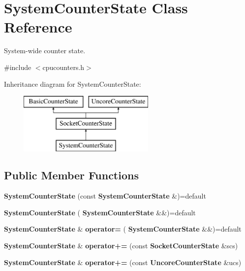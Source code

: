 \section{System\+Counter\+State Class Reference}
\label{classSystemCounterState}


System-\/wide counter state.  




{\ttfamily \#include $<$cpucounters.\+h$>$}

Inheritance diagram for System\+Counter\+State\+:\begin{figure}[H]
\begin{center}
\leavevmode
\includegraphics[height=3.000000cm]{classSystemCounterState}
\end{center}
\end{figure}
\subsection*{Public Member Functions}
\begin{DoxyCompactItemize}
\item 
\mbox{\label{classSystemCounterState_a45a2b6d817ea8ab53b280afe29632e58}} 
{\bfseries System\+Counter\+State} (const \textbf{ System\+Counter\+State} \&)=default
\item 
\mbox{\label{classSystemCounterState_a5c218867f23ed82ffda58a22314a1260}} 
{\bfseries System\+Counter\+State} (\textbf{ System\+Counter\+State} \&\&)=default
\item 
\mbox{\label{classSystemCounterState_a2016fdfda8e97189fcc96ca13cf4665e}} 
\textbf{ System\+Counter\+State} \& {\bfseries operator=} (\textbf{ System\+Counter\+State} \&\&)=default
\item 
\mbox{\label{classSystemCounterState_ae9f3b31d4a39371dc8acfa6e6c9b8fc0}} 
\textbf{ System\+Counter\+State} \& {\bfseries operator+=} (const \textbf{ Socket\+Counter\+State} \&scs)
\item 
\mbox{\label{classSystemCounterState_a91deae0a98f590d755da2d96c06be375}} 
\textbf{ System\+Counter\+State} \& {\bfseries operator+=} (const \textbf{ Uncore\+Counter\+State} \&ucs)
\end{DoxyCompactItemize}
